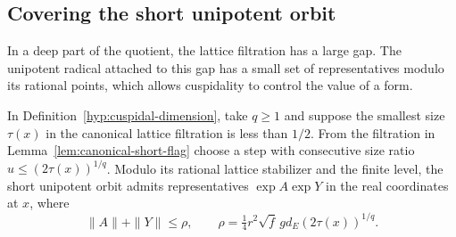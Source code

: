\subsection{Covering the short unipotent orbit}\label{sec:count-orbit}

In a deep part of the quotient, the lattice filtration has a large gap. The unipotent radical attached to this gap has a small set of representatives modulo its rational points, which allows cuspidality to control the value of a form.

\begin{proposition}\label{prop:short-orbit-cover}
In Definition~\ref{hyp:cuspidal-dimension}, take \(q\ge1\) and suppose the smallest size \(\tau(x)\) in the canonical lattice filtration is less than \(1/2\). From the filtration in
Lemma~\ref{lem:canonical-short-flag} choose a step with consecutive
size ratio \(u\le(2\tau(x))^{1/q}\). Modulo its rational lattice
stabilizer and the finite level, the short unipotent orbit admits
representatives \(\exp A\exp Y\) in the real coordinates at \(x\),
where
\[
    \|A\|+\|Y\|\le \rho,\qquad
    \rho=\tfrac14 r^2\sqrt f\,g d_E(2\tau(x))^{1/q}.
\]
\end{proposition}

